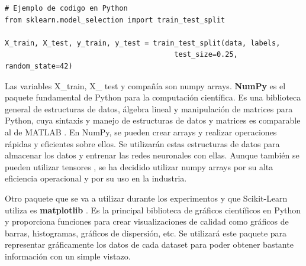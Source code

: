 \lstset{language=Python}
\begin{lstlisting}
# Ejemplo de codigo en Python
from sklearn.model_selection import train_test_split

X_train, X_test, y_train, y_test = train_test_split(data, labels,
                                        test_size=0.25, random_state=42)
\end{lstlisting}


Las variables X\_train, X\_ test y compañía son numpy arrays. \textbf{NumPy} \citep{numpy} es el paquete fundamental de Python para la computación científica. Es una biblioteca general de estructuras de datos, álgebra lineal y manipulación de matrices para Python, cuya sintaxis y manejo de estructuras de datos y matrices es comparable al de MATLAB \citep{bloice2016tutorial}. En NumPy, se pueden crear arrays y realizar operaciones rápidas y eficientes sobre ellos. Se utilizarán estas estructuras de datos para almacenar los datos y entrenar las redes neuronales con ellas. Aunque también se pueden utilizar tensores \citep{modeltraining}, se ha decidido utilizar numpy arrays por su alta eficiencia operacional y por su uso en la industria.


Otro paquete que se va a utilizar durante los experimentos y que Scikit-Learn utiliza es \textbf{matplotlib} \citep{matplotlib}. Es la principal biblioteca de gráficos científicos en Python y proporciona funciones para crear visualizaciones de calidad como gráficos de barras, histogramas, gráficos de dispersión, etc. Se utilizará este paquete para representar gráficamente los datos de cada dataset para poder obtener bastante información con un simple vistazo. 












